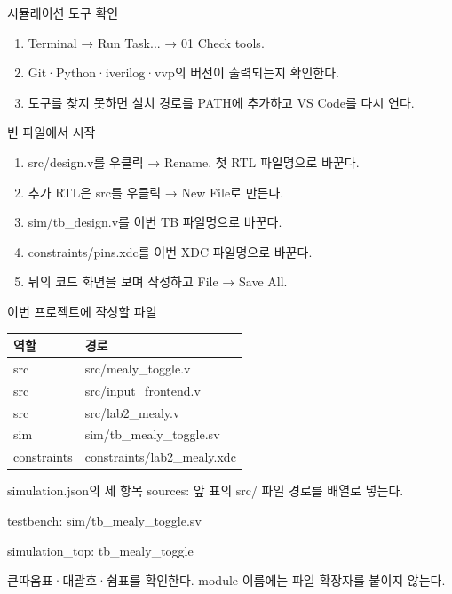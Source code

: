 \begin{frame}{시뮬레이션 도구 확인}
\small
\begin{enumerate}
\item Terminal → Run Task... → 01 Check tools.
\item Git·Python·iverilog·vvp의 버전이 출력되는지 확인한다.
\item 도구를 찾지 못하면 설치 경로를 PATH에 추가하고 VS Code를 다시 연다.
\end{enumerate}
\end{frame}

\begin{frame}{빈 파일에서 시작}
\small
\begin{enumerate}
\item src/design.v를 우클릭 → Rename. 첫 RTL 파일명으로 바꾼다.
\item 추가 RTL은 src를 우클릭 → New File로 만든다.
\item sim/tb\_design.v를 이번 TB 파일명으로 바꾼다.
\item constraints/pins.xdc를 이번 XDC 파일명으로 바꾼다.
\item 뒤의 코드 화면을 보며 작성하고 File → Save All.
\end{enumerate}
\end{frame}

\begin{frame}{이번 프로젝트에 작성할 파일}
\small
\begin{center}\renewcommand{\arraystretch}{1.55}\begin{tabular}{ll}
역할 & 경로\\\hline
src & src/mealy\_toggle.v\\
src & src/input\_frontend.v\\
src & src/lab2\_mealy.v\\
sim & sim/tb\_mealy\_toggle.sv\\
constraints & constraints/lab2\_mealy.xdc\\
\end{tabular}\end{center}
\end{frame}

\begin{frame}{simulation.json의 세 항목}
\small
sources: 앞 표의 src/ 파일 경로를 배열로 넣는다.\par\vspace{0.26cm}testbench: sim/tb\_mealy\_toggle.sv\par\vspace{0.26cm}simulation\_top: tb\_mealy\_toggle\par\vspace{0.26cm}큰따옴표·대괄호·쉼표를 확인한다. module 이름에는 파일 확장자를 붙이지 않는다.\par
\end{frame}

